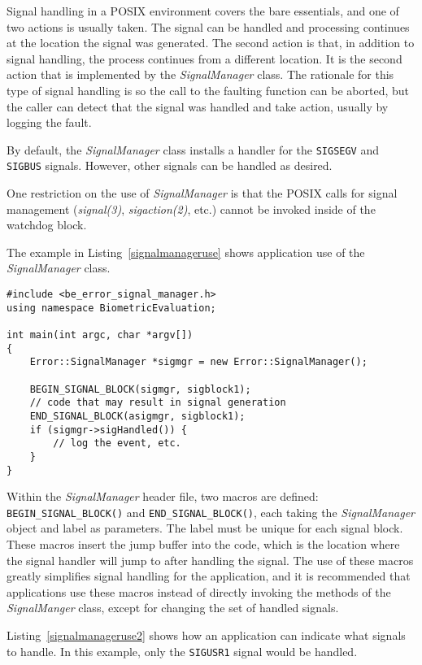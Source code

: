 Signal handling in a POSIX environment covers the bare essentials, and one of
two actions is usually taken. The signal can be handled and processing
continues at the location the signal was generated. The second action is
that, in addition to signal handling, the process continues from a different
location. It is the second action that is implemented by the
{\em SignalManager} class. The rationale for this type of signal handling is
so the call to the faulting function can be aborted, but the caller can
detect that the signal was handled and take action, usually by logging the
fault.

By default, the {\em SignalManager} class installs a handler for the
{\tt SIGSEGV} and {\tt SIGBUS} signals. However, other signals can be
handled as desired.

One restriction on the use of {\em SignalManager} is that the POSIX calls for
signal management ({\em signal(3)}, {\em sigaction(2)}, etc.) cannot be
invoked inside of the watchdog block.

The example in Listing~\ref{signalmanageruse} shows application use of the
{\em SignalManager} class.

\lstset{language=c++}
\begin{lstlisting}[caption={Using the SignalManger}, label=signalmanageruse]
#include <be_error_signal_manager.h>
using namespace BiometricEvaluation;

int main(int argc, char *argv[])
{
	Error::SignalManager *sigmgr = new Error::SignalManager();

	BEGIN_SIGNAL_BLOCK(sigmgr, sigblock1);
	// code that may result in signal generation
	END_SIGNAL_BLOCK(asigmgr, sigblock1);
	if (sigmgr->sigHandled()) {
		// log the event, etc.
	}
}
\end{lstlisting}

Within the {\em SignalManager} header file, two macros are defined:
{\tt BEGIN\_SIGNAL\_BLOCK()} and {\tt END\_SIGNAL\_BLOCK()}, each taking the
{\em SignalManager} object and label as parameters. The label must be unique
for each signal block. These macros insert the
jump buffer into the code, which is the location where the signal handler will
jump to after handling the signal. The use of these macros greatly simplifies
signal handling for the application, and it is recommended that applications
use these macros instead of directly invoking the methods of the
{\em SignalManger} class, except for changing the set of handled signals.

Listing~\ref{signalmanageruse2} shows how an application can indicate what
signals to handle. In this example, only the {\tt SIGUSR1} signal would
be handled.

